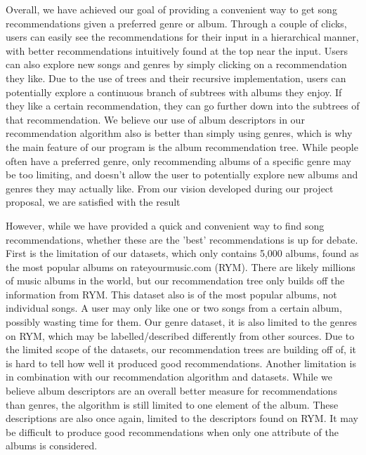 \documentclass[fontsize=11pt]{article}
\begin{document}
Overall, we have achieved our goal of providing a convenient way to get song recommendations given a preferred genre or album. Through a couple of clicks, users can easily see the recommendations for their input in a hierarchical manner, with better recommendations intuitively found at the top near the input. Users can also explore new songs and genres by simply clicking on a recommendation they like. Due to the use of trees and their recursive implementation, users can potentially explore a continuous branch of subtrees with albums they enjoy. If they like a certain recommendation, they can go further down into the subtrees of that recommendation. We believe our use of album descriptors in our recommendation algorithm also is better than simply using genres, which is why the main feature of our program is the album recommendation tree. While people often have a preferred genre, only recommending albums of a specific genre may be too limiting, and doesn't allow the user to potentially explore new albums and genres they may actually like. From our vision developed during our project proposal, we are satisfied with the result \newline

However, while we have provided a quick and convenient way to find song recommendations, whether these are the 'best' recommendations is up for debate. First is the limitation of our datasets, which only contains 5,000 albums, found as the most popular albums on rateyourmusic.com (RYM). There are likely millions of music albums in the world, but our recommendation tree only builds off the information from RYM. This dataset also is of the most popular albums, not individual songs. A user may only like one or two songs from a certain album, possibly wasting time for them. Our genre dataset, it is also limited to the genres on RYM, which may be labelled/described differently from other sources. Due to the limited scope of the datasets, our recommendation trees are building off of, it is hard to tell how well it produced good recommendations. Another limitation is in combination with our recommendation algorithm and datasets. While we believe album descriptors are an overall better measure for recommendations than genres, the algorithm is still limited to one element of the album. These descriptions are also once again, limited to the descriptors found on RYM. It may be difficult to produce good recommendations when only one attribute of the albums is considered. \newline
\end{document}
